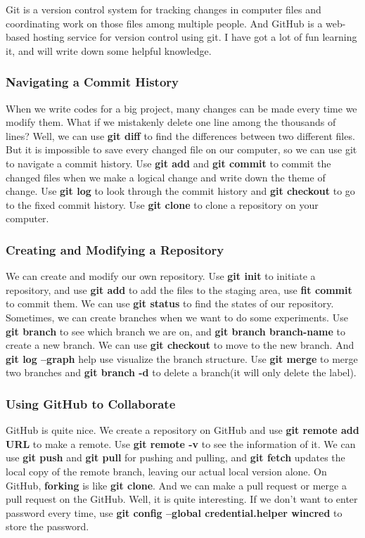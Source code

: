 \documentclass{article}
\begin{document}
Git is a version control system for tracking changes in computer files and coordinating work on those files among multiple people. And GitHub is a web-based hosting service for version control using git. I have got a lot of fun learning it, and will write down some helpful knowledge.
\subsubsection{Navigating a Commit History}

When we write codes for a big project, many changes can be made every time we modify them. What if we mistakenly delete one line among the thousands of lines? Well, we can use \textbf{git diff} to find the differences between two different files. But it is impossible to save every changed file on our computer, so we can use git to navigate a commit history. Use \textbf{git add} and \textbf{git commit} to commit the changed files when we make a logical change and write down the theme of change. Use \textbf{git log} to look through the commit history and \textbf{git checkout} to go to the fixed commit history. Use \textbf{git clone} to clone a repository on your computer.
\subsubsection{Creating and Modifying a Repository}

We can create and modify our own repository. Use \textbf{git init} to initiate a repository, and use \textbf{git add} to add the files to the staging area, use \textbf{fit commit} to commit them. We can use \textbf{git status} to find the states of our repository. Sometimes, we can create branches when we want to do some experiments. Use \textbf{git branch} to see which branch we are on, and \textbf{git branch branch-name} to create a new branch. We can use \textbf{git checkout} to move to the new branch. And \textbf{git log --graph} help use visualize the branch structure. Use \textbf{git merge} to merge two branches and \textbf{git branch -d} to delete a branch(it will only delete the label).
\subsubsection{Using GitHub to Collaborate}

GitHub is quite nice. We create a repository on GitHub and use \textbf{git remote add URL} to make a remote. Use \textbf{git remote -v} to see the information of it. We can use \textbf{git push} and \textbf{git pull} for pushing and pulling, and \textbf{git fetch} updates the local copy of the remote branch, leaving our actual local version alone. On GitHub, \textbf{forking} is like \textbf{git clone}. And we can make a pull request or merge a pull request on the GitHub. Well, it is quite interesting. If we don't want to enter password every time, use \textbf{git config --global credential.helper wincred} to store the password.
\end{document}
